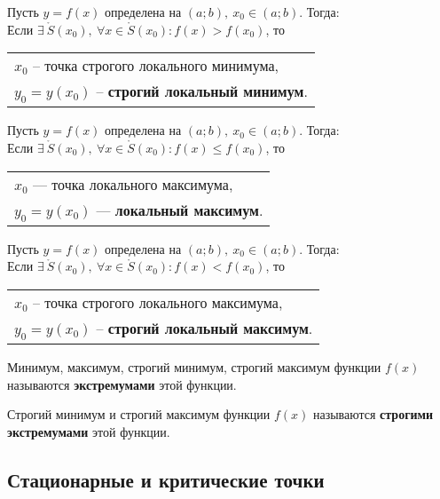 \begin{definition}
	Пусть $y=f(x)$ определена на $(a;b),\ x_0 \in (a;b)$. Тогда:\\[1ex]
	Если $\exists\ \mathring{S}(x_0),\ \forall x \in \mathring{S}(x_0)\colon f(x) > f(x_0)$, то \begin{tabular}{l} $x_0$ -- \small{точка строгого локального минимума}, \\ $y_0 = y(x_0)$ -- \small{\textbf{строгий локальный минимум}}. \end{tabular}
\end{definition}

\begin{definition}
	Пусть $y=f(x)$ определена на $(a;b),\ x_0 \in (a;b)$. Тогда:\\[1ex]
	Если $\exists\ \mathring{S}(x_0),\ \forall x \in \mathring{S}(x_0)\colon f(x) \le f(x_0)$, то \begin{tabular}{l} $x_0$ --- точка локального максимума, \\ $y_0 = y(x_0)$ --- \textbf{локальный максимум}. \end{tabular}
\end{definition}

\begin{definition}
	Пусть $y=f(x)$ определена на $(a;b),\ x_0 \in (a;b)$. Тогда:\\[1ex]
	Если $\exists\ \mathring{S}(x_0),\ \forall x \in \mathring{S}(x_0)\colon f(x) < f(x_0)$, то\hspace{-2pt} \begin{tabular}{l} $x_0$ -- \small{точка строгого локального максимума}, \\ $y_0 = y(x_0)$ -- \small{\textbf{строгий локальный максимум}}. \end{tabular}
\end{definition}

\begin{definition}
    Минимум, максимум, строгий минимум, строгий максимум функции $f(x)$ называются \textbf{экстремумами} этой функции.
\end{definition}

\begin{definition}
    Строгий минимум и строгий максимум функции $f(x)$ называются \textbf{строгими экстремумами} этой функции.
\end{definition}

\newpage
\subsection{Стационарные и критические точки}

